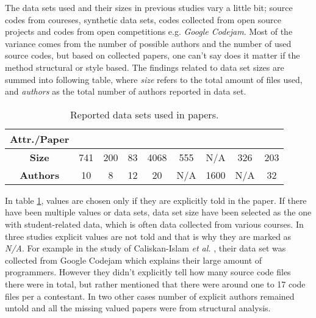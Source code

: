 \documentclass[english]{tktltiki2}
\theoremstyle{definition}
\theoremstyle{remark}
\begin{document}
The data sets used and their sizes in previous studies vary a little bit; source codes from coureses, synthetic data sets, codes collected from open source projects and codes from open competitions e.g. \textit{Google Codejam}.  Most of the variance comes from the number of possible authors and the number of used source codes, but based on collected papers, one can't say does it matter if the method structural or style based. The findings related to data set sizes are summed into following table, where \textit{size} refers to the total amount of files used, and \textit{authors} as the total number of authors reported in data set. 

\begin{table}[ht]
\centering
\begin{tabular}{c|cccccccc}
\textbf{Attr./Paper} & \cite{bandara2011machine}   & \cite{kothari2007probabilistic}   & \cite{Elenbogen:2008:DOS:1295109.1295123}  & \cite{lange2007using}    & \cite{Son:2013:APS:2508269.2508323}   & \cite{caliskan2015anonymizing}    & \cite{jadalla2008pde4java}   & \cite{rosenblum2011wrote}   \\ \hline
\textbf{Size}        & 741 & 200 & 83 & 4068 & 555 & N/A  & 326 & 203 \\
\textbf{Authors}     & 10  & 8   & 12 & 20   & N/A & 1600 & N/A & 32 
\end{tabular}
\caption{Reported data sets used in papers.}
\label{table:data}
\end{table}

\noindent
In table \ref{table:data}, values are chosen only if they are explicitly told in the paper. If there have been multiple values or data sets, data set size have been selected as the one with student-related data, which is often data collected from various courses. In three studies explicit values are not told and that is why they are marked as \textit{N/A}. For example in the study of Caliskan-Islam \textit{et al.} \cite{caliskan2015anonymizing}, their data set was collected from Google Codejam which explains their large amount of programmers. However they didn't explicitly tell how many source code files there were in total, but rather mentioned that there were around one to 17 code files per a contestant. In two other cases number of explicit authors remained untold and all the missing valued papers were from structural analysis. 
\end{document}
